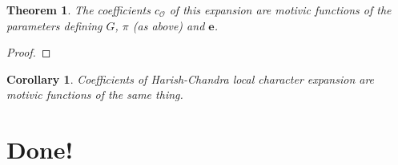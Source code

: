 \documentclass[12pt]{amsart}
\newcommand{\cO}{{\mathcal O}}
\newcommand{\mexp}{\mathbf{e}}
\def\cO{\mathcal{O}}
\theoremstyle{plain}
\newtheorem{theorem}[thm]{Theorem}
\newtheorem{cor}[thm]{Corollary}
\theoremstyle{definition}
\begin{document}
\begin{theorem} The coefficients $c_{\cO}$ of this expansion are motivic functions of the parameters defining $G$, $\pi$ (as above) and $\mexp$. 
\end{theorem}

\begin{proof}
\end{proof}

\begin{cor}
Coefficients of Harish-Chandra local character expansion are motivic functions of the same thing.
\end{cor}

\section{Done!}

\begin{bibdiv}
\begin{biblist}
\end{biblist}
\end{bibdiv}
\end{document}
